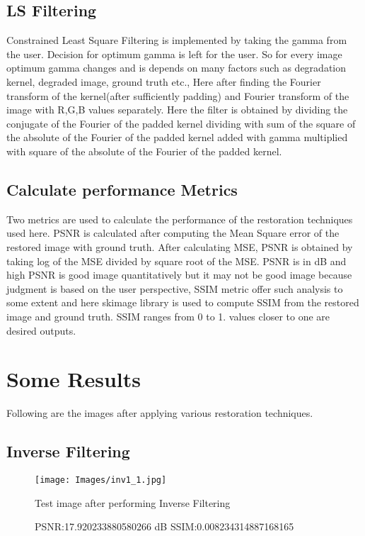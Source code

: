 \documentclass{article}
\begin{document}
\subsection{LS Filtering}
Constrained Least Square Filtering is implemented by taking the gamma from the user. Decision for optimum gamma is left for the user. So for every image optimum gamma changes and is depends on many factors such as degradation kernel, degraded image, ground truth etc., Here after finding the Fourier transform of the kernel(after sufficiently padding) and Fourier transform of the image with R,G,B values separately. Here the filter is obtained by dividing the conjugate of the Fourier of the padded kernel dividing with sum of the square of the absolute of the Fourier of the padded kernel added with gamma multiplied with square of the absolute of the Fourier of the padded kernel.

\subsection{Calculate performance Metrics}
Two metrics are used to calculate the performance of the restoration techniques used here. PSNR is calculated after computing the Mean Square error of the restored image with ground truth. After calculating MSE, PSNR is obtained by taking log of the MSE divided by square root of the MSE. PSNR is in dB and high PSNR is good image quantitatively but it may not be good image because judgment is based on the user perspective, SSIM metric offer such analysis to some extent and here skimage library is used to compute SSIM from the restored image and ground truth. SSIM ranges from 0 to 1. values closer to one are desired outputs.



\section{Some Results }
\label{sec:print}

Following are the images after applying various restoration techniques.
\subsection{Inverse Filtering}
\begin{figure}[!htbp]

\begin{minipage}[!htbp]{1.0\linewidth}
  \centering
  \centerline{\texttt{[image: Images/inv1\_1.jpg]}}
  \centerline{Test image after performing Inverse Filtering}\medskip
  PSNR:17.920233880580266 dB
  SSIM:0.008234314887168165
\end{minipage}
%
\end{figure}
\end{document}
